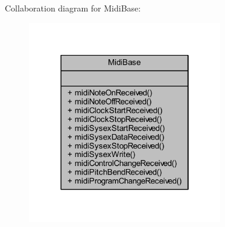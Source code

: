 Collaboration diagram for Midi\+Base\+:
\nopagebreak
\begin{figure}[H]
\begin{center}
\leavevmode
\includegraphics[width=238pt]{df/db8/class_midi_base__coll__graph}
\end{center}
\end{figure}
